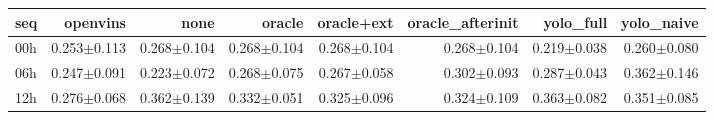 \begin{tabular}{lrrrrrrr}
\toprule
seq & openvins & none & oracle & oracle+ext & oracle\_afterinit & yolo\_full & yolo\_naive \\
\midrule
00h & 0.253$\pm$0.113 & 0.268$\pm$0.104 & 0.268$\pm$0.104 & 0.268$\pm$0.104 & 0.268$\pm$0.104 & 0.219$\pm$0.038 & 0.260$\pm$0.080 \\
06h & 0.247$\pm$0.091 & 0.223$\pm$0.072 & 0.268$\pm$0.075 & 0.267$\pm$0.058 & 0.302$\pm$0.093 & 0.287$\pm$0.043 & 0.362$\pm$0.146 \\
12h & 0.276$\pm$0.068 & 0.362$\pm$0.139 & 0.332$\pm$0.051 & 0.325$\pm$0.096 & 0.324$\pm$0.109 & 0.363$\pm$0.082 & 0.351$\pm$0.085 \\
\bottomrule
\end{tabular}
